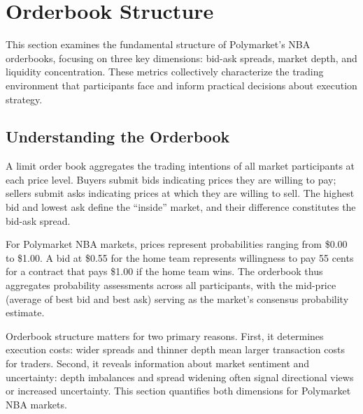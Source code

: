 
\chapter{Orderbook Structure}
\label{sec:orderbook}

This section examines the fundamental structure of Polymarket's NBA orderbooks, focusing on three key dimensions: bid-ask spreads, market depth, and liquidity concentration. These metrics collectively characterize the trading environment that participants face and inform practical decisions about execution strategy.

\section{Understanding the Orderbook}

A limit order book aggregates the trading intentions of all market participants at each price level. Buyers submit bids indicating prices they are willing to pay; sellers submit asks indicating prices at which they are willing to sell. The highest bid and lowest ask define the ``inside'' market, and their difference constitutes the bid-ask spread.

For Polymarket NBA markets, prices represent probabilities ranging from \$0.00 to \$1.00. A bid at \$0.55 for the home team represents willingness to pay 55 cents for a contract that pays \$1.00 if the home team wins. The orderbook thus aggregates probability assessments across all participants, with the mid-price (average of best bid and best ask) serving as the market's consensus probability estimate.

Orderbook structure matters for two primary reasons. First, it determines execution costs: wider spreads and thinner depth mean larger transaction costs for traders. Second, it reveals information about market sentiment and uncertainty: depth imbalances and spread widening often signal directional views or increased uncertainty. This section quantifies both dimensions for Polymarket NBA markets.

